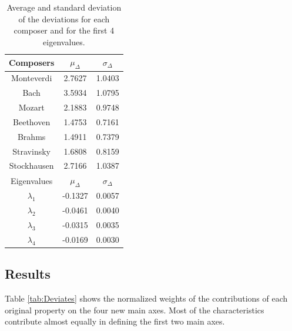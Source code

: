 \documentclass[
 aip,
 jmp,
 amsmath,amssymb,
 reprint,
]{revtex4-1}
\begin{document}
\begin{table}%
\caption{\label{tab:tableD}Average and standard deviation of the 
deviations for each composer and for the first 
4 eigenvalues.}

\begin{tabular}{|c||c|c|}
\hline

Composers & $\mu_{\Delta}$ & $\sigma_{\Delta}$ \\
\hline

Monteverdi     & 2.7627 & 1.0403 \\
Bach           & 3.5934 & 1.0795 \\
Mozart         & 2.1883 & 0.9748 \\
Beethoven      & 1.4753 & 0.7161 \\
Brahms         & 1.4911 & 0.7379 \\
Stravinsky     & 1.6808 & 0.8159 \\
Stockhausen    & 2.7166 & 1.0387 \\
\hline \hline
Eigenvalues & $\mu_{\Delta}$ & $\sigma_{\Delta}$ \\
\hline
$\lambda_1$ &  -0.1327 & 0.0057 \\
$\lambda_2$ &  -0.0461 & 0.0040 \\
$\lambda_3$ &  -0.0315 & 0.0035 \\
$\lambda_4$ &  -0.0169 & 0.0030 \\
\hline

\end{tabular}
\end{table}

\subsection{Results}

Table \ref{tab:Deviates} shows the normalized weights
of the contributions of each original property on the four
new main axes. Most of the characteristics contribute almost equally
in defining the first two main axes.
\end{document}
